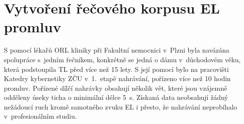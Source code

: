 \section{Vytvoření řečového korpusu EL promluv}
\label{chap:construction:corpus}



S pomocí lékařů ORL kliniky při Fakultní nemocnici v~Plzni byla navázána spolupráce s~jedním řečníkem, konkrétně se jedná o dámu v~důchodovém věku, která podstoupila TL před více než 15 lety.
S její pomocí bylo na pracovišti Katedry kybernetiky ZČU v~1.~etapě nahrávání,
pořízeno více než 10 hodin promluv.
Pořízené dílčí nahrávky obsahují několik vět, které jsou vzájemně odděleny úseky ticha o minimální délce 5~s.
Získaná data neobsahují žádný nežádoucí ruch kromě samotného zvuku EL i přesto, že nahrávání neprobíhalo v~profesionálním studiu.

